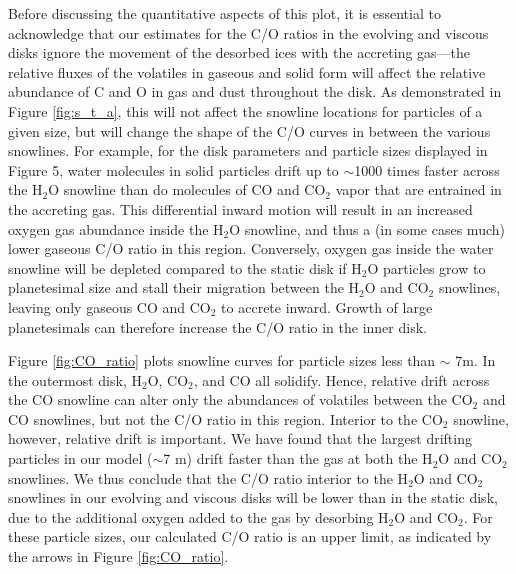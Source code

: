 \documentclass[apj]{emulateapj}
\begin{document}
Before discussing the quantitative aspects of this plot, it is essential to acknowledge that our estimates for the C/O ratios in the evolving and viscous disks ignore the movement of the desorbed ices with the accreting gas---the relative fluxes of the volatiles in gaseous and solid form will affect the relative abundance of C and O in gas and dust throughout the disk. As demonstrated in Figure \ref{fig:s_t_a}, this will not affect the snowline locations for particles of a given size, but will change the shape of the C/O curves in between the various snowlines. For example, for the disk parameters and particle sizes displayed in Figure 5, water molecules in solid particles drift up to $\sim$1000 times faster across the H$_2$O snowline than do molecules of CO and CO$_2$ vapor that are entrained in the accreting gas.  This differential inward motion will result in an increased oxygen gas abundance inside the H$_2$O snowline, and thus a (in some cases much) lower gaseous C/O ratio in this region. Conversely, oxygen gas inside the water snowline will be depleted compared to the static disk if H$_2$O particles grow to planetesimal size and stall their migration between the H$_2$O and CO$_2$ snowlines, leaving only gaseous CO and CO$_2$ to accrete inward.  Growth of large planetesimals can therefore increase the C/O ratio in the inner disk.

Figure \ref{fig:CO_ratio} plots snowline curves for particle sizes less than $\sim$ 7m.  In the outermost disk, H$_2$O, CO$_2$, and CO all solidify.  Hence, relative drift across the CO snowline can alter only the abundances of volatiles between the CO$_2$ and CO snowlines, but not the C/O ratio in this region.  Interior to the CO$_2$ snowline, however, relative drift is important. 
We have found that the largest drifting particles in our model ($\sim$7 m) drift faster than the gas at both the H$_2$O and CO$_2$ snowlines. We thus conclude that the C/O ratio interior to the H$_2$O and CO$_2$ snowlines in our evolving and viscous disks will be lower than in the static disk, due to the additional oxygen added to the gas by desorbing H$_2$O and CO$_2$.  For these particle sizes, our calculated C/O ratio is an upper limit,  as indicated by the arrows in Figure \ref{fig:CO_ratio}.


\end{document}
